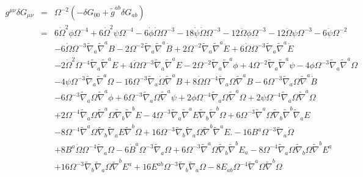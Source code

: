 \documentclass[10pt,letterpaper]{article}
\numberwithin{equation}{section}
\begin{document}
\begin{eqnarray}
g^{\mu\nu}\delta G_{\mu\nu} &=& \Omega^{-2}( -\delta G_{00} + \tilde g^{ab}\delta G_{ab})
\nonumber\\
&=&6 \dot{\Omega}^2 \phi \Omega^{-4}
+ 6 \dot{\Omega}^2 \psi \Omega^{-4}
- 6 \dot{\phi} \dot{\Omega} \Omega^{-3}
- 18 \dot{\psi} \dot{\Omega} \Omega^{-3}
- 12 \ddot{\Omega} \phi \Omega^{-3}
- 12 \ddot{\Omega} \psi \Omega^{-3}
- 6 \ddot{\psi} \Omega^{-2}\nonumber\\
&& - 6 \dot{\Omega} \Omega^{-3} \tilde{\nabla}_{a}\tilde{\nabla}^{a}B
- 2 \Omega^{-2} \tilde{\nabla}_{a}\tilde{\nabla}^{a}\dot{B}
+ 2 \Omega^{-2} \tilde{\nabla}_{a}\tilde{\nabla}^{a}\ddot{E}
+ 6 \dot{\Omega} \Omega^{-3} \tilde{\nabla}_{a}\tilde{\nabla}^{a}\dot{E}\nonumber\\
&& - 2 \dot{\Omega}^2 \Omega^{-4} \tilde{\nabla}_{a}\tilde{\nabla}^{a}E
+ 4 \ddot{\Omega} \Omega^{-3} \tilde{\nabla}_{a}\tilde{\nabla}^{a}E
- 2 \Omega^{-2} \tilde{\nabla}_{a}\tilde{\nabla}^{a}\phi
+ 4 \Omega^{-2} \tilde{\nabla}_{a}\tilde{\nabla}^{a}\psi
- 4 \phi \Omega^{-3} \tilde{\nabla}_{a}\tilde{\nabla}^{a}\Omega\nonumber\\
&& - 4 \psi \Omega^{-3} \tilde{\nabla}_{a}\tilde{\nabla}^{a}\Omega
- 16 \Omega^{-3} \tilde{\nabla}_{a}\dot{\Omega} \tilde{\nabla}^{a}B
+ 8 \dot{\Omega} \Omega^{-4} \tilde{\nabla}_{a}\Omega \tilde{\nabla}^{a}B
- 6 \Omega^{-3} \tilde{\nabla}_{a}\Omega \tilde{\nabla}^{a}\dot{B}\nonumber\\
&& - 6 \Omega^{-3} \tilde{\nabla}_{a}\Omega \tilde{\nabla}^{a}\phi
+ 6 \Omega^{-3} \tilde{\nabla}_{a}\Omega \tilde{\nabla}^{a}\psi
+ 2 \phi \Omega^{-4} \tilde{\nabla}_{a}\Omega \tilde{\nabla}^{a}\Omega
+ 2 \psi \Omega^{-4} \tilde{\nabla}_{a}\Omega \tilde{\nabla}^{a}\Omega\nonumber\\
&& + 2 \Omega^{-4} \tilde{\nabla}_{a}\Omega \tilde{\nabla}^{a}\Omega \tilde{\nabla}_{b}\tilde{\nabla}^{b}E
- 4 \Omega^{-3} \tilde{\nabla}_{a}\tilde{\nabla}^{a}E \tilde{\nabla}_{b}\tilde{\nabla}^{b}\Omega
+ 6 \Omega^{-3} \tilde{\nabla}^{a}\Omega \tilde{\nabla}_{b}\tilde{\nabla}^{b}\tilde{\nabla}_{a}E\nonumber\\
&& - 8 \Omega^{-4} \tilde{\nabla}^{a}\Omega \tilde{\nabla}_{b}\tilde{\nabla}_{a}E \tilde{\nabla}^{b}\Omega
+ 16 \Omega^{-3} \tilde{\nabla}_{b}\tilde{\nabla}_{a}\Omega \tilde{\nabla}^{b}\tilde{\nabla}^{a}E.
-16 B^{a} \Omega^{-3} \tilde{\nabla}_{a}\dot{\Omega}
\nonumber\\
&&+ 8 B^{a} \dot{\Omega} \Omega^{-4} \tilde{\nabla}_{a}\Omega
- 6 \dot{B}^{a} \Omega^{-3} \tilde{\nabla}_{a}\Omega
+ 6 \Omega^{-3} \tilde{\nabla}^{a}\Omega \tilde{\nabla}_{b}\tilde{\nabla}^{b}E_{a}- 8 \Omega^{-4} \tilde{\nabla}_{a}\Omega \tilde{\nabla}_{b}\Omega \tilde{\nabla}^{b}E^{a}
\nonumber\\
&&+ 16 \Omega^{-3} \tilde{\nabla}_{b}\tilde{\nabla}_{a}\Omega \tilde{\nabla}^{b}E^{a}
+16 E^{ab} \Omega^{-3} \tilde{\nabla}_{b}\tilde{\nabla}_{a}\Omega
- 8 E_{ab} \Omega^{-4} \tilde{\nabla}^{a}\Omega \tilde{\nabla}^{b}\Omega
\end{eqnarray}
%
%
%
%
\end{document}
